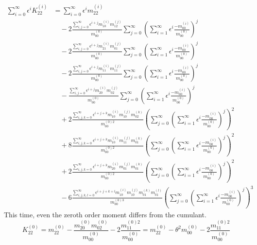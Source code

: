 \begin{equation}
  \begin{aligned}
  \sum_{i=0}^\infty \epsilon^i K_{22}^{(i)}
  & = \sum_{i=0}^\infty \epsilon^i m_{22}^{(i)}
  \\& \quad
  - 2 \frac{ \sum_{i,j=0}^\infty \epsilon^{i+j} m_{10}^{(i)} m_{12}^{(j)} }{m_{00}^{(0)}}
   \sum_{j=0}^\infty {\left(\sum_{i=1}^\infty \epsilon^i \frac{ - m_{00}^{(i)}}{ m_{00}^{(0)}}\right)}^j
  \\& \quad
  - 2 \frac{ \sum_{i,j=0}^\infty \epsilon^{i+j} m_{21}^{(i)} m_{01}^{(j)} }{m_{00}^{(0)}}
   \sum_{j=0}^\infty {\left(\sum_{i=1}^\infty \epsilon^i \frac{ - m_{00}^{(i)}}{ m_{00}^{(0)}}\right)}^j
  \\& \quad
  - 2 \frac{ \sum_{i,j=0}^\infty \epsilon^{i+j} m_{11}^{(i)} m_{11}^{(j)} }{m_{00}^{(0)}}
   \sum_{j=0}^\infty {\left(\sum_{i=1}^\infty \epsilon^i \frac{ - m_{00}^{(i)}}{ m_{00}^{(0)}}\right)}^j
  \\& \quad
  -   \frac{ \sum_{i,j=0}^\infty \epsilon^{i+j} m_{20}^{(i)} m_{02}^{(j)} }{m_{00}^{(0)}}
   \sum_{j=0}^\infty {\left(\sum_{i=1}^\infty \epsilon^i \frac{ - m_{00}^{(i)}}{ m_{00}^{(0)}}\right)}^j
  \\& \quad
  + 2 \frac{ \sum_{i,j,k=0}^\infty \epsilon^{i+j+k} m_{10}^{(i)}m_{10}^{(j)}m_{02}^{(k)} }
  {m_{00}^{(0)2}}
   {\left(
     \sum_{j=0}^\infty {\left(\sum_{i=1}^\infty \epsilon^i \frac{ - m_{00}^{(i)}}{ m_{00}^{(0)}}\right)}^j
   \right)}^2
  \\& \quad
  + 8 \frac{ \sum_{i,j,k=0}^\infty \epsilon^{i+j+k} m_{10}^{(i)}m_{11}^{(j)}m_{01}^{(k)} }
  {m_{00}^{(0)2}}
   {\left(
     \sum_{j=0}^\infty {\left(\sum_{i=1}^\infty \epsilon^i \frac{ - m_{00}^{(i)}}{ m_{00}^{(0)}}\right)}^j
   \right)}^2
  \\& \quad
  + 2 \frac{ \sum_{i,j,k=0}^\infty \epsilon^{i+j+k} m_{20}^{(i)}m_{01}^{(j)}m_{01}^{(k)} }
  {m_{00}^{(0)2}}
   {\left(
     \sum_{j=0}^\infty {\left(\sum_{i=1}^\infty \epsilon^i \frac{ - m_{00}^{(i)}}{ m_{00}^{(0)}}\right)}^j
   \right)}^2
  \\& \quad
  - 6 \frac{ \sum_{i,j,k,l=0}^\infty \epsilon^{i+j+k+l} m_{10}^{(i)}m_{10}^{(j)}m_{01}^{(k)}m_{01}^{(l)}}{m_{00}^{(0)3}}
   {\left(
     \sum_{j=0}^\infty {\left(\sum_{i=1}^\infty \epsilon^i \frac{ - m_{00}^{(i)}}{ m_{00}^{(0)}}\right)}^j
   \right)}^3
   \end{aligned}
 \end{equation}
This time, even the zeroth order moment differs from the cumulant.
\begin{equation}
  K_{22}^{(0)}
  = m_{22}^{(0)} - \frac{ m_{20}^{(0)} m_{02}^{(0)} }{m_{00}^{(0)}} - 2\frac{ m_{11}^{(0)2}  }{m_{00}^{(0)}} = m_{22}^{(0)} - \theta^2 m_{00}^{(0)} - 2\frac{ m_{11}^{(0)2}  }{m_{00}^{(0)}}
 \end{equation}
